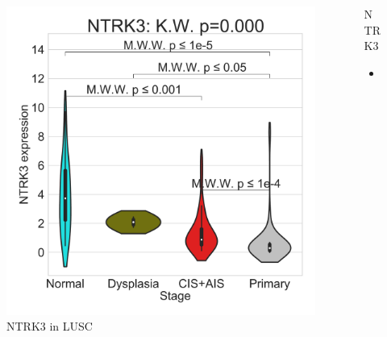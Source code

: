 \documentclass{beamer}
\begin{document}
\begin{frame}[allowframebreaks]
                    \begin{columns}
                        \begin{column}{0.4 \textwidth}
                            \begin{figure}
                                \includegraphics[width=\linewidth]{figures/DEG/Violin/STAR.TPM.SQC.violin/NTRK3.pdf}
                                \caption{NTRK3 in LUSC}
                            \end{figure}
                        \end{column}
                        \begin{column}{0.55 \textwidth}
                            \begin{block}{NTRK3}
                                \begin{itemize}
                                    \item
                                \end{itemize}
                            \end{block}
                        \end{column}
                    \end{columns}


\end{frame}
\end{document}
